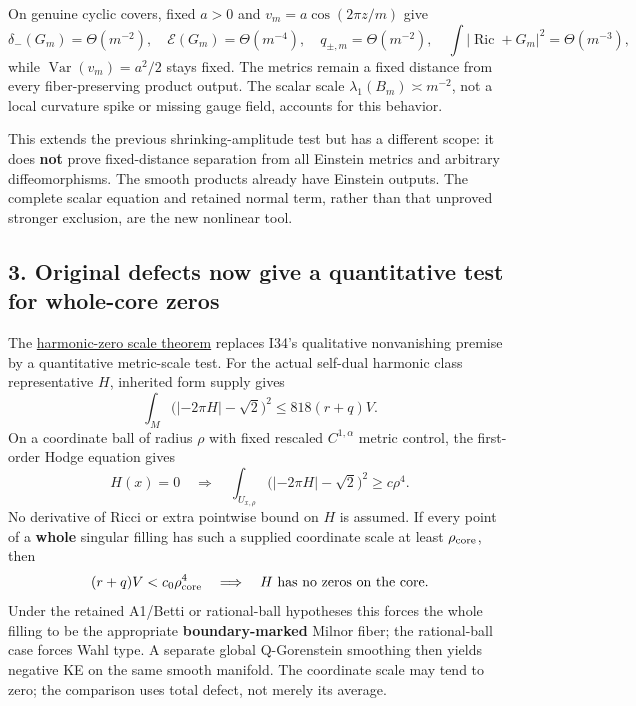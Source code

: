 \documentclass[
  11pt,
]{article}
\begin{document}
On genuine cyclic covers, fixed \(a>0\) and \(v_m=a\cos(2\pi z/m)\) give
\[
 \delta_-(G_m)=\Theta(m^{-2}),\quad
 \mathcal E(G_m)=\Theta(m^{-4}),\quad
 q_{\pm,m}=\Theta(m^{-2}),\quad
 \int|\operatorname{Ric}+G_m|^2=\Theta(m^{-3}),
\] while \(\operatorname{Var}(v_m)=a^2/2\) stays fixed. The metrics
remain a fixed distance from every fiber-preserving product output. The
scalar scale \(\lambda_1(B_m)\asymp m^{-2}\), not a local curvature
spike or missing gauge field, accounts for this behavior.

This extends the previous shrinking-amplitude test but has a different
scope: it does \textbf{not} prove fixed-distance separation from all
Einstein metrics and arbitrary diffeomorphisms. The smooth products
already have Einstein outputs. The complete scalar equation and retained
normal term, rather than that unproved stronger exclusion, are the new
nonlinear tool.

\hypertarget{original-defects-now-give-a-quantitative-test-for-whole-core-zeros}{%
\subsection{3. Original defects now give a quantitative test for
whole-core
zeros}\label{original-defects-now-give-a-quantitative-test-for-whole-core-zeros}}

The \href{20260924_harmonic_zero_scale.md}{harmonic-zero scale theorem}
replaces I34's qualitative nonvanishing premise by a quantitative
metric-scale test. For the actual self-dual harmonic class
representative \(H\), inherited form supply gives \[
 \int_M\bigl(|-2\pi H|-\sqrt2\bigr)^2
                    \le818(r+q)V.
\] On a coordinate ball of radius \(\rho\) with fixed rescaled
\(C^{1,\alpha}\) metric control, the first-order Hodge equation gives \[
 H(x)=0\quad\Longrightarrow\quad
 \int_{U_{x,\rho}}\bigl(|-2\pi H|-\sqrt2\bigr)^2\ge c\rho^4.
\] No derivative of Ricci or extra pointwise bound on \(H\) is assumed.
If every point of a \textbf{whole} singular filling has such a supplied
coordinate scale at least \(\rho_{\rm core}\), then \[
 (r+q)V<c_0\rho_{\rm core}^4
       \quad\Longrightarrow\quad H\text{ has no zeros on the core}.
\] Under the retained A1/Betti or rational-ball hypotheses this forces
the whole filling to be the appropriate \textbf{boundary-marked} Milnor
fiber; the rational-ball case forces Wahl type. A separate global
Q-Gorenstein smoothing then yields negative KE on the same smooth
manifold. The coordinate scale may tend to zero; the comparison uses
total defect, not merely its average.
\end{document}
